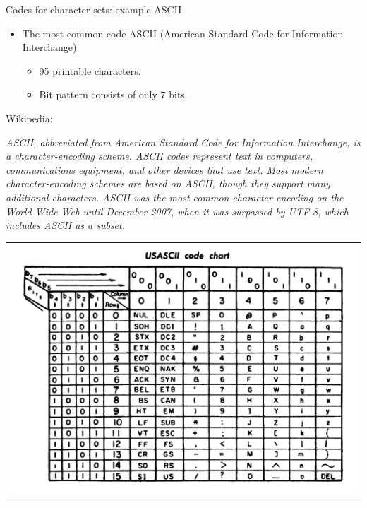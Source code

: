 \begin{vbframe}{Codes for character sets: example ASCII}

\begin{itemize}
\item The most common code  ASCII (American Standard Code for Information Interchange):
  \begin{itemize}
    \item 95 printable characters.
    \item Bit pattern consists of only $7$ bits.
  \end{itemize}
\end{itemize}

\lz

Wikipedia:

\emph{ASCII, abbreviated from American Standard Code for Information Interchange, is a character-encoding scheme.
ASCII codes represent text in computers, communications equipment, and other devices that use text.
Most modern character-encoding schemes are based on ASCII, though they support many additional characters.
ASCII was the most common character encoding on the World Wide Web until December 2007, when it was surpassed by UTF-8, which includes ASCII as a subset.}

\framebreak

\begin{center}
\begin{tabular}{l}
\includegraphics[width=0.5\paperwidth]{figure_man/ascii_code_chart}
\end{tabular}


\end{center}
\end{vbframe}
